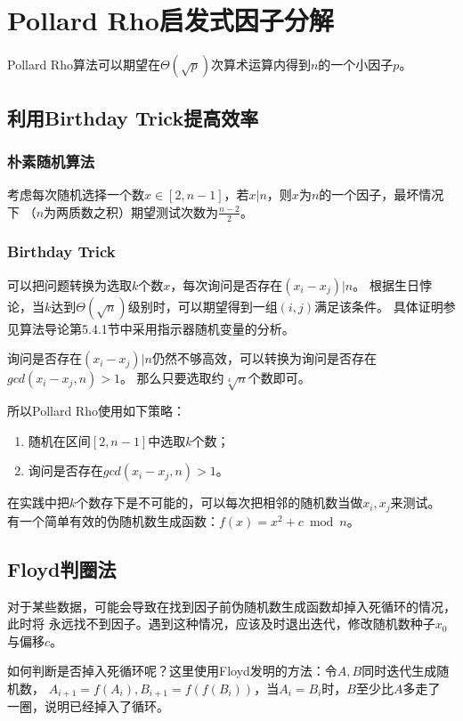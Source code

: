 \section{Pollard Rho启发式因子分解}
Pollard Rho算法可以期望在$\Theta(\sqrt{p})$次算术运算内得到$n$的一个小因子$p$。

\subsection{利用Birthday Trick提高效率}
\subsubsection{朴素随机算法}
考虑每次随机选择一个数$x\in [2,n-1]$，若$x|n$，则$x$为$n$的一个因子，最坏情况下
（$n$为两质数之积）期望测试次数为$\frac{n-2}{2}$。
\subsubsection{Birthday Trick}
可以把问题转换为选取$k$个数$x$，每次询问是否存在$(x_i-x_j)|n$。
根据生日悖论，当$k$达到$\Theta(\sqrt{n})$级别时，可以期望得到一组$(i,j)$满足该条件。
具体证明参见算法导论\cite{ITA3}第5.4.1节中采用指示器随机变量的分析。

询问是否存在$(x_i-x_j)|n$仍然不够高效，可以转换为询问是否存在$gcd(x_i-x_j,n)>1$。
那么只要选取约$\sqrt[4]{n}$个数即可。

所以Pollard Rho使用如下策略：
\begin{enumerate}
    \item 随机在区间$[2,n-1]$中选取$k$个数；
    \item 询问是否存在$gcd(x_i-x_j,n)>1$。
\end{enumerate}

在实践中把$k$个数存下是不可能的，可以每次把相邻的随机数当做$x_i,x_j$来测试。
有一个简单有效的伪随机数生成函数：$f(x)=x^2+c \bmod n$。

\subsection{Floyd判圈法}
对于某些数据，可能会导致在找到因子前伪随机数生成函数却掉入死循环的情况，此时将
永远找不到因子。遇到这种情况，应该及时退出迭代，修改随机数种子$x_0$与偏移$c$。

如何判断是否掉入死循环呢？这里使用Floyd发明的方法：令$A,B$同时迭代生成随机数，
$A_{i+1}=f(A_i),B_{i+1}=f(f(B_i))$，当$A_i=B_i$时，$B$至少比$A$多走了
一圈，说明已经掉入了循环。

